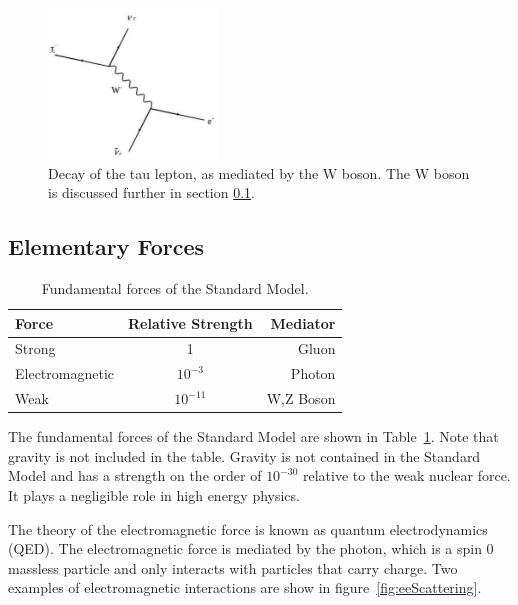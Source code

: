 \documentclass[oneside, letterpaper, oldfontcommands]{memoir}
\begin{document}
\begin{figure}[here]
\includegraphics[width=0.4\textwidth]{TauDecay.pdf}
\caption{Decay of the tau lepton, as mediated by the W boson. The W boson is discussed further in section \ref{elemforces}.}
\label{fig:TauDecay}
\end{figure}

\subsection{Elementary Forces}\label{elemforces}

\begin{table}[htbp]
  \centering
  \begin{tabular}{ | l | c | r |}
    \hline
    Force & Relative Strength & Mediator \\ \hline \hline
    Strong & 1 & Gluon \\ \hline
    Electromagnetic & $10^{-3}$ & Photon \\ \hline
    Weak & $10 ^{-11}$ & W,Z Boson \\ \hline
    
  \end{tabular}
  \caption{Fundamental forces of the Standard Model\cite{Halzen:1984mc}.}
  \label{tab:FundForces}
\end{table}

\qquad The fundamental forces of the Standard Model are shown in Table~\ref{tab:FundForces}. Note that gravity is not included in the table. Gravity is not contained in the Standard Model and has a strength on the order of $10^{-30}$ \cite{Barger:0201058766} relative to the weak nuclear force. It plays a negligible role in high energy physics.

\qquad The theory of the electromagnetic force is known as quantum electrodynamics (QED). The electromagnetic force is mediated by the photon, which is a spin 0 massless particle and only interacts with particles that carry charge. Two examples of electromagnetic interactions are show in figure~\ref{fig:eeScattering}.
\end{document}
